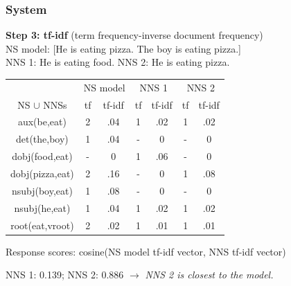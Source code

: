 \documentclass[xcolor={dvipsnames}]{beamer}
\begin{document}
\begin{frame}
\frametitle{System}
\small
\textbf{Step 3: tf-idf} (term frequency-inverse document frequency) \\
\vspace{.5em}
\pause
NS model: [He is eating pizza. The boy is eating pizza.] \\ 
\vspace{.5em}
\pause
NNS 1: He is eating food. \hspace{1.4em} \pause NNS 2: He is eating pizza. \\

\pause
\vspace{-.6em}
\footnotesize
\begin{table}[htb!]
\begin{center}
\begin{tabular}{|c||c|c||c|c||c|c|}
\hline
 & \multicolumn{2}{c||}{NS model} & \multicolumn{2}{c||}{NNS 1} & \multicolumn{2}{c|}{NNS 2} \\
\cline{2-7}
NS $\cup$ NNSs & tf & tf-idf & tf & tf-idf & tf & tf-idf \\
\hline
aux(be,eat) & 2 & .04 & 1  &  .02 &  1 & .02 \\ 
\hline
det(the,boy) & 1 & .04 &  -  & 0 & - & 0 \\
\hline
dobj(food,eat) & - & 0 & 1   & .06 & - & 0 \\
\hline
dobj(pizza,eat) & 2 & .16 & -   & 0 & 1 & .08 \\
\hline
nsubj(boy,eat) & 1 & .08 & -  & 0 & - & 0 \\
\hline
nsubj(he,eat) & 1 & .04 & 1   & .02 & 1 & .02 \\
\hline
root(eat,vroot) & 2 & .02 & 1   & .01 & 1 & .01 \\ %
\hline
\end{tabular}
\end{center}
\end{table}

\vspace{.5em}

\small
Response scores: cosine(NS model tf-idf vector, NNS tf-idf vector) \\
\vspace{.5em} 

\pause
NNS 1: 0.139; \hspace{.6em} \pause NNS 2: 0.886 \pause \hspace{.6em} $\rightarrow$ \hspace{.6em} \textit{NNS 2 is closest to the model.} \\

\end{frame}
\end{document}
